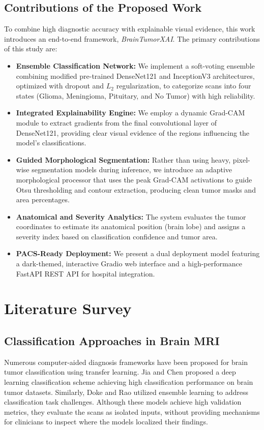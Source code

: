 \documentclass[journal,twoside]{IEEEtran}
\begin{document}
\subsection{Contributions of the Proposed Work}
To combine high diagnostic accuracy with explainable visual evidence, this work introduces an end-to-end framework, \textit{BrainTumorXAI}. The primary contributions of this study are:
\begin{itemize}
    \item \textbf{Ensemble Classification Network:} We implement a soft-voting ensemble combining modified pre-trained DenseNet121 and InceptionV3 architectures, optimized with dropout and $L_2$ regularization, to categorize scans into four states (Glioma, Meningioma, Pituitary, and No Tumor) with high reliability.
    \item \textbf{Integrated Explainability Engine:} We employ a dynamic Grad-CAM module to extract gradients from the final convolutional layer of DenseNet121, providing clear visual evidence of the regions influencing the model's classifications.
    \item \textbf{Guided Morphological Segmentation:} Rather than using heavy, pixel-wise segmentation models during inference, we introduce an adaptive morphological processor that uses the peak Grad-CAM activations to guide Otsu thresholding and contour extraction, producing clean tumor masks and area percentages.
    \item \textbf{Anatomical and Severity Analytics:} The system evaluates the tumor coordinates to estimate its anatomical position (brain lobe) and assigns a severity index based on classification confidence and tumor area.
    \item \textbf{PACS-Ready Deployment:} We present a dual deployment model featuring a dark-themed, interactive Gradio web interface and a high-performance FastAPI REST API for hospital integration.
\end{itemize}

\section{Literature Survey}
\subsection{Classification Approaches in Brain MRI}
Numerous computer-aided diagnosis frameworks have been proposed for brain tumor classification using transfer learning. Jia and Chen \cite{jia2020} proposed a deep learning classification scheme achieving high classification performance on brain tumor datasets. Similarly, Doke and Rao \cite{doke2024} utilized ensemble learning to address classification task challenges. Although these models achieve high validation metrics, they evaluate the scans as isolated inputs, without providing mechanisms for clinicians to inspect where the models localized their findings.
\end{document}

